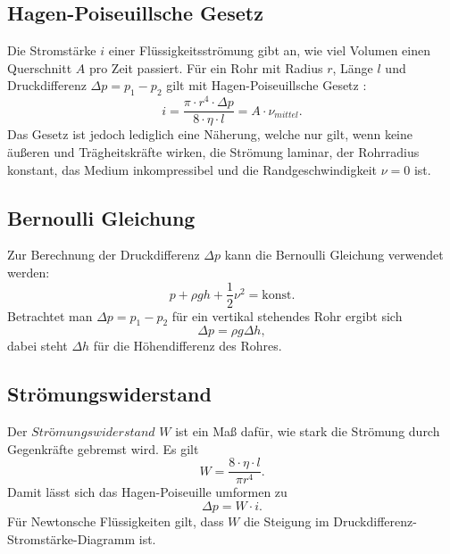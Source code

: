 \documentclass{article}
\begin{document}
\subsection{Hagen-Poiseuillsche Gesetz}
Die Stromstärke $i$ einer Flüssigkeitsströmung gibt an, wie viel Volumen einen Querschnitt $A$ pro Zeit passiert. Für ein Rohr mit Radius $r$, Länge $l$ und Druckdifferenz $\Delta p = p_1 - p_2$ gilt mit Hagen-Poiseuillsche Gesetz \cite{1}:
\begin{equation}
    i = \frac{\pi \cdot r^4 \cdot \Delta p}{8 \cdot \eta \cdot l} = A \cdot \nu_{mittel}.
\end{equation}
Das Gesetz ist jedoch lediglich eine Näherung, welche nur gilt, wenn keine äußeren und Trägheitskräfte wirken, die Strömung laminar, der Rohrradius konstant, das Medium inkompressibel und die Randgeschwindigkeit $\nu = 0$ ist.
\subsection{Bernoulli Gleichung}
Zur Berechnung der Druckdifferenz $\Delta p$ kann die Bernoulli Gleichung verwendet werden:
\begin{equation}
    p + \rho g h +\frac{1}{2} \nu^2 = \textrm{konst.}
\end{equation}
Betrachtet man $\Delta p = p_1 - p_2$ für ein vertikal stehendes Rohr ergibt sich
\begin{equation}
    \Delta p = \rho g \Delta h,
\end{equation}
dabei steht $\Delta h$ für die Höhendifferenz des Rohres.
\subsection{Strömungswiderstand}
Der $\textit{Strömungswiderstand}$ $W$ ist ein Maß dafür, wie stark die Strömung durch Gegenkräfte gebremst wird. Es gilt
\begin{equation}
    W = \frac{8 \cdot \eta \cdot l}{\pi r^4}.
\end{equation}
Damit lässt sich das Hagen-Poiseuille umformen zu
\begin{equation}
    \Delta p = W \cdot i.
\end{equation}
Für Newtonsche Flüssigkeiten gilt, dass $W$ die Steigung im Druckdifferenz-Stromstärke-Diagramm ist.
\end{document}
